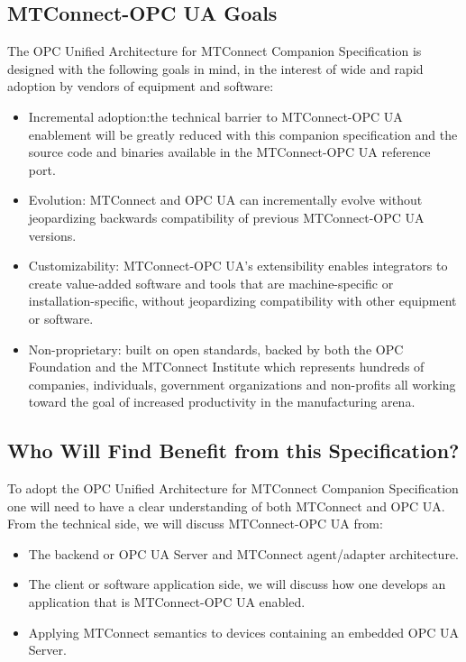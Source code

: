 \subsection{MTConnect-OPC UA Goals}

The OPC Unified Architecture for MTConnect Companion Specification is designed with the following goals in mind, in the interest of wide and rapid adoption by vendors of equipment and software:

\begin{itemize}
    \item Incremental adoption:the technical barrier to MTConnect-OPC UA enablement will be greatly reduced with this companion specification and the source code and binaries available in the MTConnect-OPC UA reference port.
    \item Evolution: MTConnect and OPC UA can incrementally evolve without jeopardizing backwards compatibility of previous MTConnect-OPC UA versions.
    \item Customizability: MTConnect-OPC UA's extensibility enables integrators to create value-added software and tools that are machine-specific or installation-specific, without jeopardizing compatibility with other equipment or software.
    \item Non-proprietary: built on open standards, backed by both the OPC Foundation and the MTConnect Institute which represents hundreds of companies, individuals, government organizations and non-profits all working toward the goal of increased productivity in the manufacturing arena.
\end{itemize}

\subsection{Who Will Find Benefit from this Specification?}

To adopt the OPC Unified Architecture for MTConnect Companion Specification one will need to have a clear understanding of both MTConnect and OPC UA. From the technical side, we will discuss MTConnect-OPC UA from:

\begin{itemize}
    \item The backend or OPC UA Server and MTConnect agent/adapter architecture.
    \item The client or software application side, we will discuss how one develops an application that is MTConnect-OPC UA enabled.
    \item Applying MTConnect semantics to devices containing an embedded OPC UA Server.
\end{itemize}

